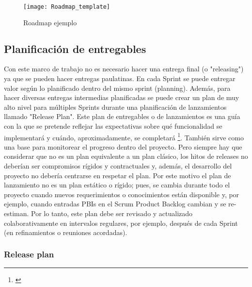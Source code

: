 \begin{figure}[h]
  \centering
  \texttt{[image: Roadmap\_template]}
  \caption{Roadmap ejemplo}
  \centering
  \label{fig:Roadmap_template} %
\end{figure}
\FloatBarrier %

\subsection{Planificación de entregables}

Con este marco de trabajo no es necesario hacer una entrega final (o "releasing") ya que se pueden hacer entregas paulatinas. En cada Sprint se puede entregar valor según lo planificado dentro del mismo sprint (planning). Además, para hacer diversas entregas intermedias planificadas se puede crear un plan de muy alto nivel para múltiples Sprints durante una planificación de lanzamientos llamado "Release Plan". Este plan de entregables o de lanzamientos es una guía con la que se pretende reflejar las expectativas sobre qué funcionalidad se implementará y cuándo, aproximadamente, se completará \footnote{\cite{Scrum-Institute-2015}}. También sirve como una base para monitorear el progreso dentro del proyecto. Pero siempre hay que considerar que no es un plan equivalente a un plan clásico, los hitos de releases no deberían ser compromisos rígidos y contractuales y, además, el desarrollo del proyecto no debería centrarse en respetar el plan. Por este motivo el plan de lanzamiento no es un plan estático o rígido; pues, se cambia durante todo el proyecto cuando nuevos requerimientos o conocimientos están disponible y, por ejemplo, cuando entradas PBIs en el Scrum Product Backlog cambian y se re-estiman. Por lo tanto, este plan debe ser revisado y actualizado colaborativamente en intervalos regulares, por ejemplo, después de cada Sprint (en refinamientos o reuniones acordadas).

\subsubsection{Release plan}

